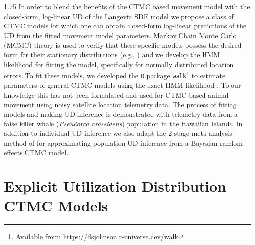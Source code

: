 \documentclass[12pt]{article}
\begin{document}
\begin{spacing}{1.75}
In order to blend the benefits of the CTMC based movement model with the closed-form, log-linear UD of the Langevin SDE model we propose a class of CTMC models for which one can obtain closed-form log-linear predictions of the UD from the fitted movement model parameters. Markov Chain Monte Carlo (MCMC) theory is used to verify that these specific models possess the desired form for their stationary distributions (e.g., \citealt{michelot2018linking, Blackwell2026a}) and we develop the HMM likelihood for fitting the model, specifically for normally distributed location errors. To fit these models, we developed the {\tt R} package {\tt walk}\footnote{Available from: \url{https://dsjohnson.r-universe.dev/walk}} \citep{Johnson2026a} to estimate parameters of general CTMC models using the exact HMM likelihood \citep{mcclintock2020uncovering}. To our knowledge this has not been formulated and used for CTMC-based animal movement using noisy satellite location telemetry data. The process of fitting models and making UD inference is demonstrated with telemetry data from a false killer whale (\emph{Pseudorca crassidens}) population in the Hawaiian Islands. In addition to individual UD inference we also adapt the 2-stage meta-analysis method of \cite{johnson2022greater} for approximating population UD inference from a Bayesian random effects CTMC model.  


\section{Explicit Utilization Distribution CTMC Models}


\end{spacing}
\end{document}
